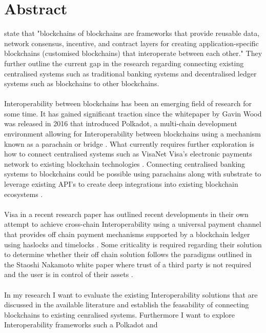 \documentclass[12pt]{article}
\begin{document}
\section{Abstract}
\autocite{belchiorSurveyBlockchainInteroperability2021}
state that "blockchains of blockchains are frameworks that provide reusable data, network consensus, incentive, 
and contract layers for creating application-specific blockchains (customised blockchains) that interoperate between each other."
They further outline the current gap in the research regarding connecting existing centralised systems such as traditional banking
systems and decentralised ledger systems such as blockchains to other blockchains.
\\\\
Interoperability between blockchains has been an emerging field of
research for some time. It has gained significant traction since the whitepaper by Gavin Wood was released in 2016 that introduced Polkadot, 
a multi-chain development environment allowing for Interoperability between blockchains using a mechanism known as a parachain or bridge \autocite{woodPOLKADOTVISIONHETEROGENEOUS2016}.
What currently requires further exploration is how to connect centralised systems such as VisaNet Visa's electronic payments network to existing blockchain technologies \autocite{VisaNetTechnologyVisa}.
Connecting centralised banking systems to blockchains could be possible using parachains along with substrate to leverage existing API's to create deep integrations into existing blockchain ecosystems \autocite{polkadotPolkadotDecoded20202021}.
\\\\ 
Visa in a recent research paper has outlined recent developments in their own attempt to achieve cross-chain Interoperability using a universal payment channel that provides off chain payment mechanisms 
supported by a blockchain ledger using haslocks and timelocks \autocite{christodorescuUniversalPaymentChannels2021}. Some criticality is required regarding their solution to determine whether their off chain solution follows the paradigms
outlined in the Staoshi Nakamoto white paper where trust of a third party is not required and the user is in control of their assets \autocite{nakamotoBitcoinPeertoPeerElectronic}.
\\\\
In my research I want to evaluate the existing Interoperability solutions that are discussed in the available literature and establish the feasability of connecting blockchains to existing cenralised systems.
Furthermore I want to explore Interoperability frameworks such a Polkadot and 
\end{document}
